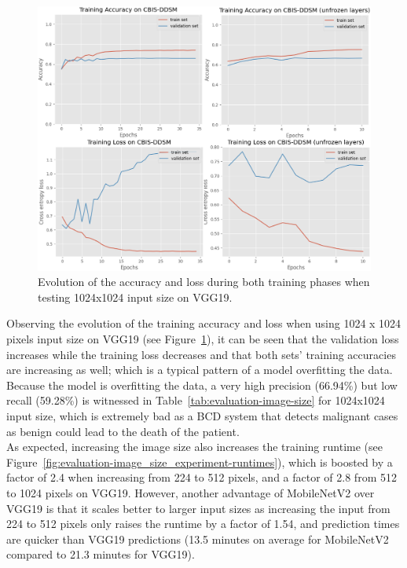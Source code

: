 \begin{figure}[h]
\centerline{\includegraphics[width=1.2\textwidth]{figures/evaluation/image_size_experiment/training_summary.png}}
\caption{\label{fig:evaluation-image_size_experiment-training_summary}Evolution of the accuracy and loss during both training phases when testing 1024x1024 input size on VGG19.}
\end{figure}

Observing the evolution of the training accuracy and loss when using 1024 x 1024 pixels input size on VGG19 (see Figure~\ref{fig:evaluation-image_size_experiment-training_summary}), it can be seen that the validation loss increases while the training loss decreases and that both sets' training accuracies are increasing as well; which is a typical pattern of a model overfitting the data. Because the model is overfitting the data, a very high precision (66.94\%) but low recall (59.28\%) is witnessed in Table~\ref{tab:evaluation-image-size} for 1024x1024 input size, which is extremely bad as a BCD system that detects malignant cases as benign could lead to the death of the patient.\\

As expected, increasing the image size also increases the training runtime (see Figure~\ref{fig:evaluation-image_size_experiment-runtimes}), which is boosted by a factor of 2.4 when increasing from 224 to 512 pixels, and a factor of 2.8 from 512 to 1024 pixels on VGG19. However, another advantage of MobileNetV2 over VGG19 is that it scales better to larger input sizes as increasing the input from 224 to 512 pixels only raises the runtime by a factor of 1.54, and prediction times are quicker than VGG19 predictions (13.5 minutes on average for MobileNetV2 compared to 21.3 minutes for VGG19).

